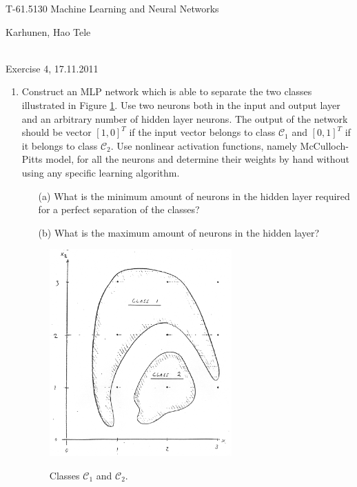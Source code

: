 \documentclass[10pt]{article}
\begin{document}
\pagestyle{empty}
\begin{Large}
\begin{bf} 
T-61.5130 Machine Learning and Neural Networks\\ 
\end{bf}
\end{Large}
Karhunen, Hao Tele\\  
\\
\begin{large}
\begin{bf}
Exercise 4,  17.11.2011
\end{bf}
\end{large}
\begin{enumerate}

\item Construct an MLP network which is able to separate the two
  classes illustrated in Figure \ref{61}. Use two neurons both in the input
  and output layer and an arbitrary number of hidden layer
  neurons. The output of the network should be vector $\left[ 1,
  0\right]^T$ if the input vector belongs to class $\mathcal{C}_1$ and  $\left[ 0,
  1\right]^T$ if it belongs to class $\mathcal{C}_2$. Use nonlinear activation
  functions, namely McCulloch-Pitts model, for all the neurons and
  determine their weights by hand without using any specific learning
  algorithm.
\begin{itemize}
\item[(a)] What is the minimum amount of neurons in the hidden layer
  required for a perfect separation of the classes?
\item[(b)] What is the maximum amount of neurons in the hidden layer?
\end{itemize}

\begin{figure}[hbp]
\centering
\includegraphics[width=7cm]{mlp_classification.ps}
\label{61}
\caption{Classes $\mathcal{C}_1$ and $\mathcal{C}_2$.}
\end{figure}


\end{enumerate}
\end{document}
